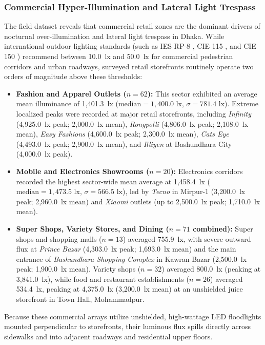 \documentclass[11pt,a4paper]{article}
\begin{document}
\subsubsection{Commercial Hyper-Illumination and Lateral Light Trespass}
The field dataset reveals that commercial retail zones are the dominant drivers of nocturnal over-illumination and lateral light trespass in Dhaka. While international outdoor lighting standards (such as IES RP-8 \cite{ies_rp8}, CIE 115 \cite{cie115}, and CIE 150 \cite{cie150}) recommend between 10.0~lx and 50.0~lx for commercial pedestrian corridors and urban roadways, surveyed retail storefronts routinely operate two orders of magnitude above these thresholds:
\begin{itemize}
    \item \textbf{Fashion and Apparel Outlets (\(n = 62\)):} This sector exhibited an average mean illuminance of 1,401.3~lx (\(\text{median} = 1,400.0\text{ lx}\), \(\sigma = 781.4\text{ lx}\)). Extreme localized peaks were recorded at major retail storefronts, including \textit{Infinity} (4,925.0~lx peak; 2,000.0~lx mean), \textit{Rongpolli} (4,806.0~lx peak; 2,108.0~lx mean), \textit{Easy Fashions} (4,600.0~lx peak; 2,300.0~lx mean), \textit{Cats Eye} (4,493.0~lx peak; 2,900.0~lx mean), and \textit{Illiyen} at Bashundhara City (4,000.0~lx peak).
    \item \textbf{Mobile and Electronics Showrooms (\(n = 20\)):} Electronics corridors recorded the highest sector-wide mean average at 1,458.4~lx (\(\text{median} = 1,473.5\text{ lx}\), \(\sigma = 566.5\text{ lx}\)), led by \textit{Tecno} in Mirpur-1 (3,200.0~lx peak; 2,960.0~lx mean) and \textit{Xiaomi} outlets (up to 2,500.0~lx peak; 1,710.0~lx mean).
    \item \textbf{Super Shops, Variety Stores, and Dining (\(n = 71\) combined):} Super shops and shopping malls (\(n = 13\)) averaged 755.9~lx, with severe outward flux at \textit{Prince Bazar} (4,303.0~lx peak; 1,693.0~lx mean) and the main entrance of \textit{Bashundhara Shopping Complex} in Kawran Bazar (2,500.0~lx peak; 1,900.0~lx mean). Variety shops (\(n = 32\)) averaged 800.0~lx (peaking at 3,841.0~lx), while food and restaurant establishments (\(n = 26\)) averaged 534.4~lx, peaking at 4,375.0~lx (3,200.0~lx mean) at an unshielded juice storefront in Town Hall, Mohammadpur.
\end{itemize}

Because these commercial arrays utilize unshielded, high-wattage LED floodlights mounted perpendicular to storefronts, their luminous flux spills directly across sidewalks and into adjacent roadways and residential upper floors.
\end{document}
